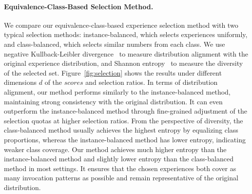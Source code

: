 \documentclass[11pt]{article}
\begin{document}
\paragraph{Equivalence-Class-Based Selection Method.} We compare our equivalence-class-based experience selection method with two typical selection methods: instance-balanced, which selects experiences uniformly, and class-balanced, which selects similar numbers from each class. We use negative Kullback-Leibler divergence~\cite{kl} to measure distribution alignment with the original experience distribution, and Shannon entropy~\cite{entropy} to measure the diversity of the selected set. Figure~\ref{fig:selection} shows the results under different dimensions $d$ of the $scores$ and selection ratios. In terms of distribution alignment, our method performs similarly to the instance-balanced method, maintaining strong consistency with the original distribution. It can even outperform the instance-balanced method through fine-grained adjustment of the selection quotas at higher selection ratios. From the perspective of diversity, the class-balanced method usually achieves the highest entropy by equalizing class proportions, whereas the instance-balanced method has lower entropy, indicating weaker class coverage. Our method achieves much higher entropy than the instance-balanced method and slightly lower entropy than the class-balanced method in most settings. It ensures that the chosen experiences both cover as many invocation patterns as possible and remain representative of the original distribution.


\end{document}
